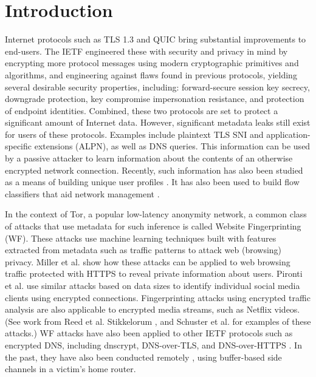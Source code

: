 \documentclass[runningheads]{llncs}
\begin{document}
\section{Introduction}
Internet protocols such as TLS 1.3 \cite{rfc8446} and QUIC \cite{ietf-quic-transport-16}
bring substantial improvements to end-users.
The IETF engineered these with security and privacy in mind by encrypting
more protocol messages using modern cryptographic primitives and algorithms, and engineering
against flaws found in previous protocols, yielding several desirable security
properties, including: forward-secure session key secrecy, downgrade protection, key
compromise impersonation resistance, and protection of endpoint identities.
Combined, these two protocols are set to protect a significant amount of Internet data.
However, significant metadata leaks still exist for users of these protocols. Examples include
plaintext TLS SNI and application-specific extensions (ALPN), as well as DNS queries. This information
can be used by a passive attacker to learn information about the contents of an otherwise
encrypted network connection. Recently, such information has also been studied as a means
of building unique user profiles \cite{li2018can}. It has also been used to build flow classifiers
that aid network management \cite{foremski2014dns}.

In the context of Tor, a popular low-latency anonymity network, a common class of attacks that use
metadata for such inference is called Website Fingerprinting (WF).
These attacks use machine learning techniques built with
features extracted from metadata such as traffic patterns to attack web (browsing) privacy.
Miller et al. \cite{miller2014know} show how these attacks can be applied to web browsing
traffic protected with HTTPS to reveal private information about users.
Pironti et al. \cite{pironti2012identifying} use similar attacks based on data sizes to
identify individual social media clients using encrypted connections.
Fingerprinting attacks using encrypted traffic analysis are also applicable to encrypted
media streams, such as Netflix videos. (See work from Reed et al. \cite{reed2017identifying}
Stikkelorum \cite{stikkelorum2017know}, and Schuster et al. \cite{schuster2017beauty}
for examples of these attacks.) WF attacks have also been applied to other IETF
protocols such as encrypted DNS, including dnscrypt, DNS-over-TLS,
and DNS-over-HTTPS \cite{siby2018dns,shulman2014pretty}. In the past, they have also
been conducted remotely \cite{gong2010fingerprinting}, using buffer-based side channels
in a victim's home router.
\end{document}
